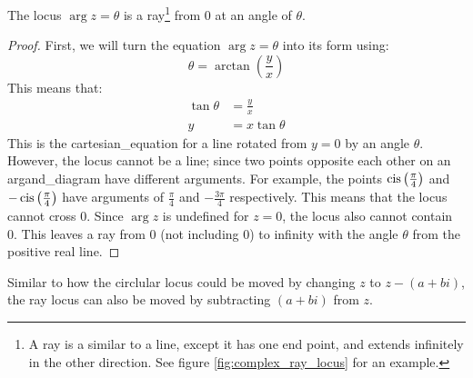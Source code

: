             \begin{theorem} \label{thm:complex_ray_locus_origin}
                The \gls{locus} $\arg z=\theta$ is a ray\footnote{A ray is a similar to a line, except it has one end point, and extends infinitely in the other direction. See figure \ref{fig:complex_ray_locus} for an example.} from 0 at an angle of $\theta$.
            \end{theorem}
            \begin{proof}
                First, we will turn the equation $\arg z=\theta$ into its  form using:
                \begin{equation}
                    \theta=\arctan\left(\frac{y}{x}\right)
                \end{equation}
                This means that:
                \begin{equation*}
                    \begin{aligned}
                        \tan\theta&=\frac{y}{x} \\
                        y&=x\tan\theta
                    \end{aligned}
                \end{equation*}
                This is the \gls{cartesian_equation} for a line rotated from $y=0$ by an angle $\theta$.
                However, the \gls{locus} cannot be a line; since two points opposite each other on an \gls{argand_diagram} have different \glspl{argument}.
                For example, the points $\operatorname{cis}\left(\frac{\pi}{4}\right)$ and $-\operatorname{cis}\left(\frac{\pi}{4}\right)$ have \glspl{argument} of $\frac{\pi}{4}$ and $-\frac{3\pi}{4}$ respectively.
                This means that the \gls{locus} cannot cross 0.
                Since $\arg z$ is undefined for $z=0$, the locus also cannot contain 0.
                This leaves a ray from 0 (not including 0) to infinity with the angle $\theta$ from the positive real line.
            \end{proof}

            Similar to how the circlular \gls{locus} could be moved by changing $z$ to $z-(a+bi)$, the ray \gls{locus} can also be moved by subtracting $(a+bi)$ from $z$.

